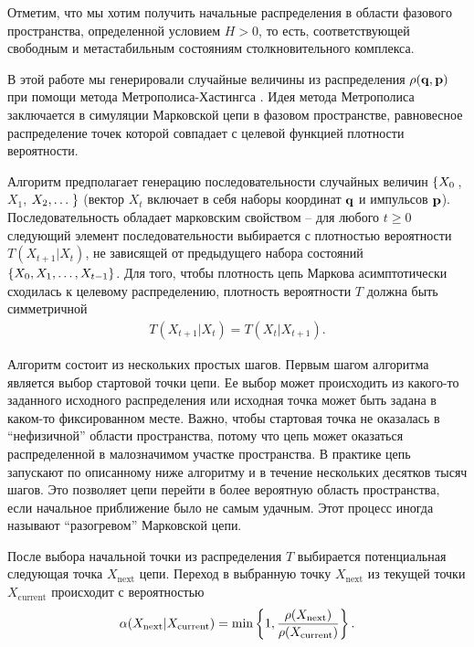 Отметим, что мы хотим получить начальные распределения в области фазового пространства, определенной условием $H > 0$, то есть, соответствующей свободным и метастабильным состояниям столкновительного комплекса. \par
В этой работе мы генерировали случайные величины из распределения $\rho(\mathbf{q}, \mathbf{p})$ при помощи метода Метрополиса-Хастингса \cite{liu2008}. Идея метода Метрополиса заключается в симуляции Марковской цепи в фазовом пространстве, равновесное распределение точек которой совпадает с целевой функцией плотности вероятности. \par
Алгоритм предполагает генерацию последовательности случайных величин $\left\{ X_0 \right.$, $X_1$, $X_2, \dots \left. \right\}$ (вектор $X_t$ включает в себя наборы координат $\mathbf{q}$ и импульсов $\mathbf{p}$). Последовательность обладает марковским свойством -- для любого $t \geq 0$ следующий элемент последовательности выбирается с плотностью вероятности $T(X_{t +1} \vert X_t)$, не зависящей от предыдущего набора состояний $\left\{ X_0, X_1, \dots, X_{t - 1} \right\}$. Для того, чтобы плотность цепь Маркова асимптотически сходилась к целевому распределению, плотность вероятности $T$ должна быть симметричной 
\begin{gather}
    T(X_{t+1} \vert X_t) = T(X_t \vert X_{t+1}).
\end{gather}

Алгоритм состоит из нескольких простых шагов. Первым шагом алгоритма является выбор стартовой точки цепи. Ее выбор может происходить из какого-то заданного исходного распределения или исходная точка может быть задана в каком-то фиксированном месте. Важно, чтобы стартовая точка не оказалась в \enquote{нефизичной} области пространства, потому что цепь может оказаться распределенной в малозначимом участке пространства. В практике цепь запускают по описанному ниже алгоритму и в течение нескольких десятков тысяч шагов. Это позволяет цепи перейти в более вероятную область пространства, если начальное приближение было не самым удачным. Этот процесс иногда называют \enquote{разогревом} Марковской цепи. \par
После выбора начальной точки из распределения $T$ выбирается потенциальная следующая точка $X_\text{next}$ цепи. Переход в выбранную точку $X_\text{next}$ из текущей точки $X_\text{current}$ происходит с вероятностью
\begin{gather}
    \alpha(X_\text{next} | X_\text{current}) = \min \left\{ 1, \frac{\rho(X_\text{next})}{\rho(X_\text{current})} \right\}.
\end{gather}

